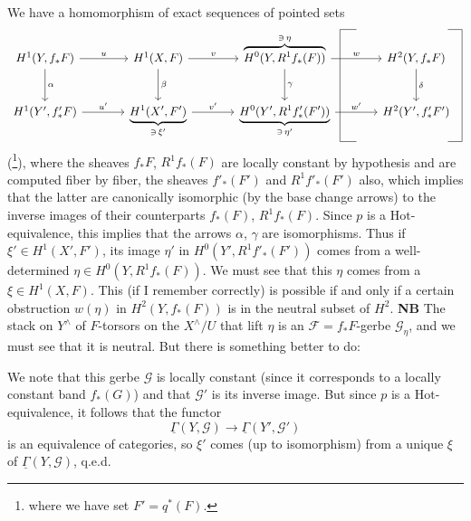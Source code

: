 \documentclass[11pt]{article}
\newcommand{\printedpage}[1]{\marginpar{\footnotesize p.~#1}}
\newcommand{\msp}[1]{\marginpar{\footnotesize [#1]}}
\newcommand{\Hot}{\mathrm{Hot}}
\begin{document}
\noindent We have a homomorphism of exact sequences of pointed sets
\[
\begin{tikzcd}[column sep=large, row sep=large,
  every matrix/.append style={name=m},
  execute at end picture={
    \coordinate (lb) at ([xshift=0.4em]m-2-3.east);
    \coordinate (lt) at ([xshift=1.8em]m-2-3.east);
    \draw (lt |- m-1-3.north) -- (lb |- m-1-3.north) -- (lb |- m-2-3.south) -- (lt |- m-2-3.south);
    \coordinate (rb) at ([xshift=0.6em]m-2-4.east);
    \coordinate (rt) at ([xshift=-0.6em]m-2-4.east);
    \draw (rt |- m-1-3.north) -- (rb |- m-1-3.north) -- (rb |- m-2-3.south) -- (rt |- m-2-3.south);
  }]
H^1(Y, f_*F) \arrow[r, "u"] \arrow[d, "\alpha"] & H^1(X,F) \arrow[r, "v"] \arrow[d, "\beta"] & \overbrace{H^0(Y, R^1 f_*(F))}^{\ni\, \eta} \arrow[r, "w"] \arrow[d, "\gamma"] & H^2(Y, f_*F) \arrow[d, "\delta"] \\
H^1(Y', f'_*F) \arrow[r, "u'"] & \underbrace{H^1(X', F')}_{\ni\, \xi'} \arrow[r, "v'"] & \underbrace{H^0(Y', R^1 f'_*(F'))}_{\ni\, \eta'} \arrow[r, "w'"] & H^2(Y', f'_*F') %
\end{tikzcd}
\]
(\footnote{where we have set $F' = q^*(F)$.}), where the sheaves $f_*F$, $R^1 f_*(F)$ are locally constant by hypothesis and are computed fiber by fiber, the sheaves $f'_*(F')$ and $R^1 f'_*(F')$ also, which implies that the latter are
\printedpage{3}
canonically isomorphic (by the base change arrows) to the inverse images of their counterparts $f_*(F)$, $R^1 f_*(F)$. Since $p$ is a $\Hot$-equivalence, this implies that the arrows $\alpha$, $\gamma$ are isomorphisms. Thus if $\xi' \in H^1(X', F')$, its image $\eta'$ in $H^0(Y', R^1 f'_*(F'))$ comes from a well-determined $\eta \in H^0(Y, R^1 f_*(F))$. We must see that this $\eta$ comes from a $\xi \in H^1(X,F)$. This (if I remember correctly) is possible if and only if a certain obstruction $w(\eta)$ in $H^2(Y, f_*(F))$ is in the neutral subset of $H^2$. \textbf{NB} The stack on $Y^\wedge$ of $F$-torsors on the $X^\wedge/U$ that lift $\eta$ is an $\mathcal{F} = f_*F$-gerbe $\mathcal{G}_\eta$, and we must see that it is neutral. But there is something better to do:


\msp{page 130}

\noindent We note that this gerbe $\mathcal{G}$ is locally constant (since it corresponds to a locally constant band $f_*(G)$) and that $\mathcal{G}'$ is its inverse image. But since $p$ is a $\Hot$-equivalence, it follows that the functor
\[
\underline{\Gamma}(Y, \mathcal{G}) \longrightarrow \underline{\Gamma}(Y', \mathcal{G}')
\]
is an equivalence of categories, so $\xi'$ comes (up to isomorphism) from a unique $\xi$ of $\underline{\Gamma}(Y, \mathcal{G})$, q.e.d.
\end{document}
